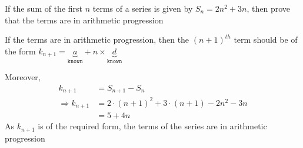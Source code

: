 
%
%
%
%
% 
% 

\question[4] If the sum of the first $n$ terms of a series is given by 
$S_n = 2n^2+3n$, then prove that the terms are in arithmetic progression


\ifprintanswers
\fi 

\begin{solution}[\halfpage]
  If the terms are in arithmetic progression, then the $(n+1)^{th}$ term should be 
  of the form $k_{n+1} = \underbrace{a}_{\texttt{known}} + n\times\underbrace{d}_{\texttt{known}}$
  
  Moreover,
  \begin{align}
     k_{n+1} &= S_{n+1} - S_n \\
        \Rightarrow k_{n+1} &= 2\cdot(n+1)^2 + 3\cdot(n+1) - 2n^2 - 3n \\
        &= 5 + 4n
  \end{align}
  As $k_{n+1}$ is of the required form, the terms of the series are in arithmetic progression
  
\end{solution}

